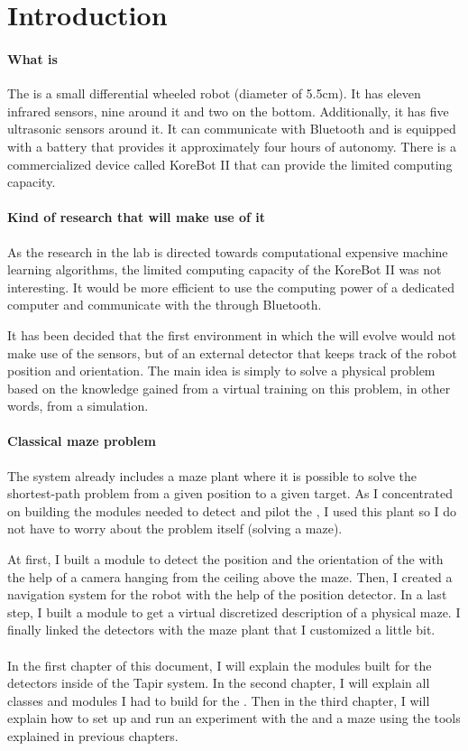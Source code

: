 \chapter{Introduction}

\subsubsection{What is \khepera{}}
The \khepera{} is a small differential wheeled robot (diameter of 5.5cm). 
It has eleven infrared sensors, nine around it and two on the bottom. 
Additionally, it has five ultrasonic sensors around it. It can communicate 
with Bluetooth and is equipped with a battery that provides it 
approximately four hours of autonomy. There is a commercialized device 
called KoreBot II that can provide the \khepera{} limited computing 
capacity. 

\subsubsection{Kind of research that will make use of it}
As the research in the lab is directed towards computational expensive machine learning 
algorithms, the limited computing capacity of the KoreBot II was not 
interesting. It would be more efficient to use the computing power of 
a dedicated computer and communicate with the \khepera{} through 
Bluetooth.

It has been decided that the first environment 
in which the \khepera{} will evolve would not make use of the sensors, 
but of an external detector that keeps track of the robot position and 
orientation. The main idea is simply to solve a physical problem based 
on the knowledge gained from a virtual training on this problem, in 
other words, from a simulation.

\subsubsection{Classical maze problem}
The \clsquare{} system already includes a maze plant where it is possible 
to solve the shortest-path problem from a given position to a given 
target. As I concentrated on building the modules needed to detect and 
pilot the \khepera{}, I used this plant so I do not have to worry 
about the problem itself (solving a maze).

At first, I built a module to detect the position and the 
orientation of the \khepera{} with the help of a camera hanging from 
the ceiling above the maze. Then, I created a navigation 
system for the robot with the help of the position detector. In a 
last step, I built a module to get a virtual discretized description 
of a physical maze. I finally linked the detectors with the maze plant 
that I customized a little bit.
\\
\\
In the first chapter of this document, I will explain the modules built 
for the detectors inside of the Tapir system. In the second chapter, 
I will explain all classes and modules I had to build for the \clsquare{}.
Then in the third chapter, I will explain how to set up and run an 
experiment with the \khepera{} and a maze using the tools explained 
in previous chapters. 

